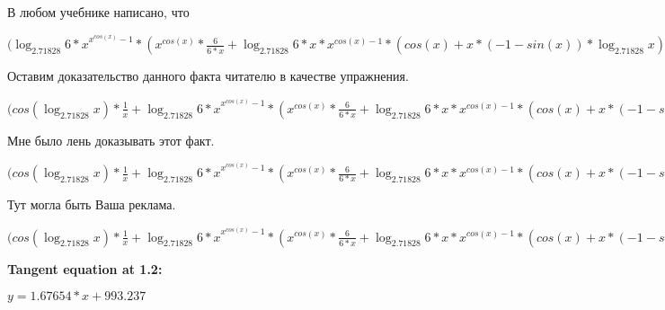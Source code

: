\documentclass[12pt,a4paper,fleqn]{article}
\theoremstyle{definition}
\begin{document}
В любом учебнике написано, что

$({\log_{ 2.71828 }{ 6  *  x }}^{{ x }^{cos( x )} -  1 } * ({ x }^{cos( x )} * \frac{ 6 }{ 6  *  x }
 + \log_{ 2.71828 }{ 6  *  x } * { x }^{cos( x ) -  1 } * (cos( x ) +  x  * ( -1  - sin( x )) * \log_{ 2.71828 }{ x }) * \log_{ 2.71828 }{\log_{ 2.71828 }{ 6  *  x }}) = {\log_{ 2.71828 }{ 6  *  x }}^{{ x }^{cos( x )} -  1 } * ({ x }^{cos( x )} * \frac{ 6 }{ 6  *  x }
 + \log_{ 2.71828 }{ 6  *  x } * { x }^{cos( x ) -  1 } * (cos( x ) +  x  * ( -1  - sin( x )) * \log_{ 2.71828 }{ x }) * \log_{ 2.71828 }{\log_{ 2.71828 }{ 6  *  x }})$

Оставим доказательство данного факта читателю в качестве упражнения.

$(cos(\log_{ 2.71828 }{ x }) * \frac{ 1 }{ x }
 + {\log_{ 2.71828 }{ 6  *  x }}^{{ x }^{cos( x )} -  1 } * ({ x }^{cos( x )} * \frac{ 6 }{ 6  *  x }
 + \log_{ 2.71828 }{ 6  *  x } * { x }^{cos( x ) -  1 } * (cos( x ) +  x  * ( -1  - sin( x )) * \log_{ 2.71828 }{ x }) * \log_{ 2.71828 }{\log_{ 2.71828 }{ 6  *  x }}) = cos(\log_{ 2.71828 }{ x }) * \frac{ 1 }{ x }
 + {\log_{ 2.71828 }{ 6  *  x }}^{{ x }^{cos( x )} -  1 } * ({ x }^{cos( x )} * \frac{ 6 }{ 6  *  x }
 + \log_{ 2.71828 }{ 6  *  x } * { x }^{cos( x ) -  1 } * (cos( x ) +  x  * ( -1  - sin( x )) * \log_{ 2.71828 }{ x }) * \log_{ 2.71828 }{\log_{ 2.71828 }{ 6  *  x }})$

Мне было лень доказывать этот факт.

$(cos(\log_{ 2.71828 }{ x }) * \frac{ 1 }{ x }
 + {\log_{ 2.71828 }{ 6  *  x }}^{{ x }^{cos( x )} -  1 } * ({ x }^{cos( x )} * \frac{ 6 }{ 6  *  x }
 + \log_{ 2.71828 }{ 6  *  x } * { x }^{cos( x ) -  1 } * (cos( x ) +  x  * ( -1  - sin( x )) * \log_{ 2.71828 }{ x }) * \log_{ 2.71828 }{\log_{ 2.71828 }{ 6  *  x }}) +  0  = cos(\log_{ 2.71828 }{ x }) * \frac{ 1 }{ x }
 + {\log_{ 2.71828 }{ 6  *  x }}^{{ x }^{cos( x )} -  1 } * ({ x }^{cos( x )} * \frac{ 6 }{ 6  *  x }
 + \log_{ 2.71828 }{ 6  *  x } * { x }^{cos( x ) -  1 } * (cos( x ) +  x  * ( -1  - sin( x )) * \log_{ 2.71828 }{ x }) * \log_{ 2.71828 }{\log_{ 2.71828 }{ 6  *  x }})$

Тут могла быть Ваша реклама.

$(cos(\log_{ 2.71828 }{ x }) * \frac{ 1 }{ x }
 + {\log_{ 2.71828 }{ 6  *  x }}^{{ x }^{cos( x )} -  1 } * ({ x }^{cos( x )} * \frac{ 6 }{ 6  *  x }
 + \log_{ 2.71828 }{ 6  *  x } * { x }^{cos( x ) -  1 } * (cos( x ) +  x  * ( -1  - sin( x )) * \log_{ 2.71828 }{ x }) * \log_{ 2.71828 }{\log_{ 2.71828 }{ 6  *  x }}) -  0  = cos(\log_{ 2.71828 }{ x }) * \frac{ 1 }{ x }
 + {\log_{ 2.71828 }{ 6  *  x }}^{{ x }^{cos( x )} -  1 } * ({ x }^{cos( x )} * \frac{ 6 }{ 6  *  x }
 + \log_{ 2.71828 }{ 6  *  x } * { x }^{cos( x ) -  1 } * (cos( x ) +  x  * ( -1  - sin( x )) * \log_{ 2.71828 }{ x }) * \log_{ 2.71828 }{\log_{ 2.71828 }{ 6  *  x }})$


\textbf{Tangent equation at 1.2:}

$y = 1.67654 * x + 993.237$
\end{document}
